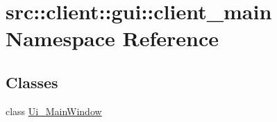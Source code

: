 \hypertarget{namespacesrc_1_1client_1_1gui_1_1client__main}{
\section{src::client::gui::client\_\-main Namespace Reference}
\label{namespacesrc_1_1client_1_1gui_1_1client__main}
}
\subsection*{Classes}
\begin{DoxyCompactItemize}
\item 
class \hyperlink{classsrc_1_1client_1_1gui_1_1client__main_1_1Ui__MainWindow}{Ui\_\-MainWindow}
\end{DoxyCompactItemize}
